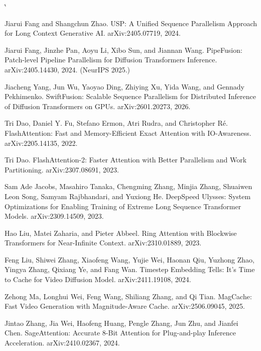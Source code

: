 \documentclass[11pt]{article}
\makeatletter
\renewenvironment{thebibliography}[1]{%
  \list{\@biblabel{\@arabic\c@enumiv}}{%
    \settowidth\labelwidth{\@biblabel{#1}}%
    \leftmargin\labelwidth
    \advance\leftmargin\labelsep
    \@openbib@code
    \usecounter{enumiv}%
    \let\p@enumiv\@empty
    \renewcommand\theenumiv{\@arabic\c@enumiv}}%
  \sloppy
  \clubpenalty4000
  \@clubpenalty\clubpenalty
  \widowpenalty4000
  \sfcode`\.\@m
}{%
  \def\@noitemerr{\@latex@warning{Empty `thebibliography' environment}}%
  \endlist
}
\makeatother
\begin{document}
\begin{thebibliography}{10}

Jiarui Fang and Shangchun Zhao. USP: A Unified Sequence Parallelism Approach for Long Context Generative AI. arXiv:2405.07719, 2024.

Jiarui Fang, Jinzhe Pan, Aoyu Li, Xibo Sun, and Jiannan Wang. PipeFusion: Patch-level Pipeline Parallelism for Diffusion Transformers Inference. arXiv:2405.14430, 2024. (NeurIPS 2025.)

Jiacheng Yang, Jun Wu, Yaoyao Ding, Zhiying Xu, Yida Wang, and Gennady Pekhimenko. SwiftFusion: Scalable Sequence Parallelism for Distributed Inference of Diffusion Transformers on GPUs. arXiv:2601.20273, 2026.

Tri Dao, Daniel Y. Fu, Stefano Ermon, Atri Rudra, and Christopher R\'e. FlashAttention: Fast and Memory-Efficient Exact Attention with IO-Awareness. arXiv:2205.14135, 2022.

Tri Dao. FlashAttention-2: Faster Attention with Better Parallelism and Work Partitioning. arXiv:2307.08691, 2023.

Sam Ade Jacobs, Masahiro Tanaka, Chengming Zhang, Minjia Zhang, Shuaiwen Leon Song, Samyam Rajbhandari, and Yuxiong He. DeepSpeed Ulysses: System Optimizations for Enabling Training of Extreme Long Sequence Transformer Models. arXiv:2309.14509, 2023.

Hao Liu, Matei Zaharia, and Pieter Abbeel. Ring Attention with Blockwise Transformers for Near-Infinite Context. arXiv:2310.01889, 2023.

Feng Liu, Shiwei Zhang, Xiaofeng Wang, Yujie Wei, Haonan Qiu, Yuzhong Zhao, Yingya Zhang, Qixiang Ye, and Fang Wan. Timestep Embedding Tells: It's Time to Cache for Video Diffusion Model. arXiv:2411.19108, 2024.

Zehong Ma, Longhui Wei, Feng Wang, Shiliang Zhang, and Qi Tian. MagCache: Fast Video Generation with Magnitude-Aware Cache. arXiv:2506.09045, 2025.

Jintao Zhang, Jia Wei, Haofeng Huang, Pengle Zhang, Jun Zhu, and Jianfei Chen. SageAttention: Accurate 8-Bit Attention for Plug-and-play Inference Acceleration. arXiv:2410.02367, 2024.

\end{thebibliography}
\end{document}
